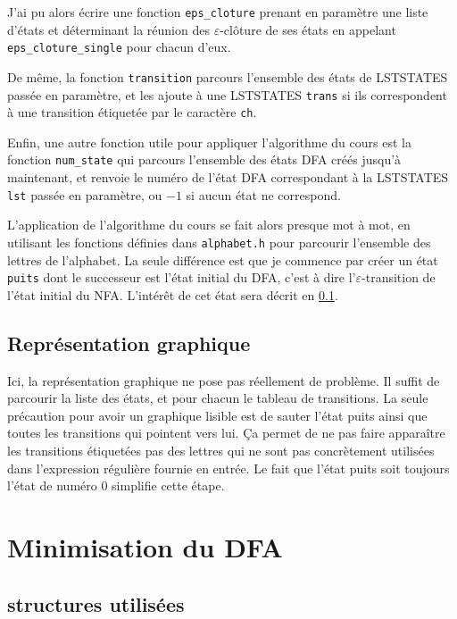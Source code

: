 \documentclass[12pt, a4paper]{article}
\begin{document}
J'ai pu alors écrire une fonction \texttt{eps\_cloture} prenant en paramètre une liste d'états et déterminant la réunion des $\varepsilon$-clôture de ses états en appelant \texttt{eps\_cloture\_single} pour chacun d'eux.

De même, la fonction \texttt{transition} parcours l'ensemble des états de LSTSTATES passée en paramètre, et les ajoute à une LSTSTATES \texttt{trans} si ils correspondent à une transition étiquetée par le caractère \texttt{ch}.

Enfin, une autre fonction utile pour appliquer l'algorithme du cours est la fonction \texttt{num\_state} qui parcours l'ensemble des états DFA créés jusqu'à maintenant, et renvoie le numéro de l'état DFA correspondant à la LSTSTATES \texttt{lst} passée en paramètre, ou $-1$ si aucun état ne correspond. 

L'application de l'algorithme du cours se fait alors presque mot à mot, en utilisant les fonctions définies dans \texttt{alphabet.h} pour parcourir l'ensemble des lettres de l'alphabet. La seule différence est que je commence par créer un état \texttt{puits} dont le successeur est l'état initial du DFA, c'est à dire l'$\varepsilon$-transition de l'état initial du NFA. L'intérêt de cet état sera décrit en \ref{dfa_graph}.


\subsection{Représentation graphique}
\label{dfa_graph}

Ici, la représentation graphique ne pose pas réellement de problème. Il suffit de parcourir la liste des états, et pour chacun le tableau de transitions. La seule précaution pour avoir un graphique lisible est de sauter l'état puits ainsi que toutes les transitions qui pointent vers lui. Ça permet de ne pas faire apparaître les transitions étiquetées pas des lettres qui ne sont pas concrètement utilisées dans l'expression régulière fournie en entrée. Le fait que l'état puits soit toujours l'état de numéro 0 simplifie cette étape.

\section{Minimisation du DFA}

\subsection{structures utilisées}
\end{document}
